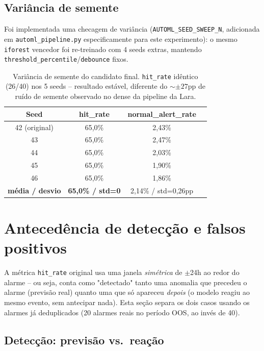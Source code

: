 \documentclass[11pt,a4paper]{article}
\begin{document}
\subsection{Variância de semente}
\label{sec:seed}

Foi implementada uma checagem de variância (\texttt{AUTOML\_SEED\_SWEEP\_N},
adicionada em \texttt{automl\_pipeline.py} especificamente para este
experimento): o mesmo \texttt{iforest} vencedor foi re-treinado com 4 seeds
extras, mantendo \texttt{threshold\_percentile}/\texttt{debounce} fixos.

\begin{table}[H]
\centering
\begin{tabular}{@{}cccc@{}}
\toprule
\textbf{Seed} & \textbf{hit\_rate} & \textbf{normal\_alert\_rate} & \\
\midrule
42 (original) & 65,0\% & 2,43\% & \\
43 & 65,0\% & 2,47\% & \\
44 & 65,0\% & 2,03\% & \\
45 & 65,0\% & 1,90\% & \\
46 & 65,0\% & 1,86\% & \\
\midrule
\textbf{média / desvio} & \textbf{65,0\% / std=0} & 2,14\% / std=0,26pp & \\
\bottomrule
\end{tabular}
\caption{Variância de semente do candidato final. \texttt{hit\_rate} idêntico
(26/40) nos 5 seeds -- resultado estável, diferente do $\sim\pm27$pp de
ruído de semente observado no dense da pipeline da Lara.}
\end{table}

\section{Antecedência de detecção e falsos positivos}
\label{sec:antecedencia}

A métrica \texttt{hit\_rate} original usa uma janela \emph{simétrica} de
$\pm$24h ao redor do alarme -- ou seja, conta como "detectado" tanto uma
anomalia que precedeu o alarme (previsão real) quanto uma que só apareceu
\emph{depois} (o modelo reagiu ao mesmo evento, sem antecipar nada). Esta
seção separa os dois casos usando os alarmes já deduplicados
(20 alarmes reais no período OOS, ao invés de 40).

\subsection{Detecção: previsão vs.\ reação}
\end{document}
